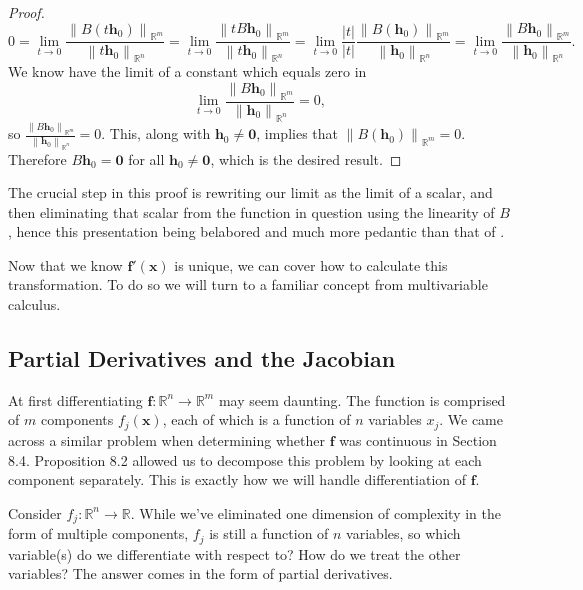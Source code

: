\documentclass{article}
\newcommand{\R}{\mathbb{R}}
\newcommand{\x}{\mathbf{x}}
\newcommand{\f}{\mathbf{f}}
\newcommand{\h}{\mathbf{h}}
\newcommand{\ze}{\mathbf{0}}
\newcommand{\norm}[1]{\left\lVert#1\right\rVert}
\theoremstyle{definition}
\begin{document}
\begin{proof}
		$$ 0 = \lim\limits_{t\to 0}\frac{\norm{B(t\h_0)}_{\R^m}}{\norm{t\h_0}_{\R^n}} =  \lim\limits_{t\to 0}\frac{\norm{tB\h_0}_{\R^m}}{\norm{t\h_0}_{\R^n}}   =  \lim\limits_{t\to 0}\frac{|t|}{|t|}\frac{\norm{B(\h_0)}_{\R^m}}{\norm{\h_0}_{\R^n}} = \lim\limits_{t\to 0}\frac{\norm{B\h_0}_{\R^m}}{\norm{\h_0}_{\R^n}} .$$ We know have the limit of a constant which equals zero in 
		$$  \lim\limits_{t\to 0}\frac{\norm{B\h_0}_{\R^m}}{\norm{\h_0}_{\R^n}} = 0 ,$$ so $ \frac{\norm{B\h_0}_{\R^m}}{\norm{\h_0}_{\R^n}} = 0$. This, along with $ \h_0\neq \ze $, implies that  $ \norm{B(\h_0)}_{\R^m} = 0$. Therefore $ B\h_0 = \ze $ for all $ \h_0\neq \ze $, which is the desired result. 
	\end{proof}
	
	The crucial step in this proof is rewriting our limit as the limit of a scalar, and then eliminating that scalar from the function in question using the linearity of $ B $, hence this presentation being belabored and much more pedantic than that of \cite{rudin1964principles}.  
	
	Now that we know $ \f'(\x) $ is unique, we can cover how to calculate this transformation. To do so we will turn to a familiar concept from multivariable calculus. 
	
	\subsection{Partial Derivatives and the Jacobian}
	At first differentiating $ \f:\R^n\to\R^m $ may seem daunting. The function is comprised of $ m $ components $ f_j(\x) $, each of which is a function of $ n $ variables $ x_j $. We came across a similar problem when determining whether $ \f $ was continuous in Section 8.4. Proposition 8.2 allowed us to decompose this problem by looking at each component separately. This is exactly how we will handle differentiation of $ \f $. 
	
	Consider $ f_j:\R^n\to \R $. While we've eliminated one dimension of complexity in the form of multiple components, $ f_j $ is still a function of $ n $ variables, so which variable(s) do we differentiate with respect to? How do we treat the other variables? The answer comes in the form of partial derivatives.
	
\end{document}
